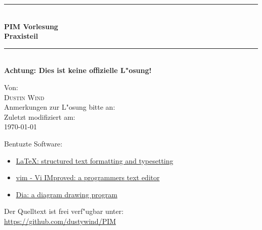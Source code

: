 

\newcommand{\TitleHRule}{\rule{\linewidth}{0.5mm}}

\begin{titlepage}
    \begin{center}

    \TitleHRule \\[0.4cm]
    { \huge \bfseries PIM Vorlesung\\Praxisteil\\[0.4cm] }
    \TitleHRule \\[1.5cm]

    \textbf{Achtung: Dies ist keine offizielle L"osung!}

    \vfill
    Von:\\
    \textsc{Dustin Wind}\\

    \vfill
    Anmerkungen zur L"osung bitte an:\\


   \vfill
    Zuletzt modifiziert am:\\
    {\large \today}\\
    \end{center}
    \bigskip

    {\small
    \noindent
    Bentuzte Software:
    \begin{itemize}
        \item \href{http://www.latex-project.org}{\LaTeX{}: structured text formatting and typesetting}
        \item \href{http://www.vim.org}{vim - Vi IMproved: a programmers text editor}
        \item \href{https://wiki.gnome.org/Apps/Dia/}{Dia: a diagram drawing program}
    \end{itemize}
    \noindent
    Der Quelltext ist frei verf"ugbar unter:\\
    \url{https://github.com/dustywind/PIM}
    }

\end{titlepage}

